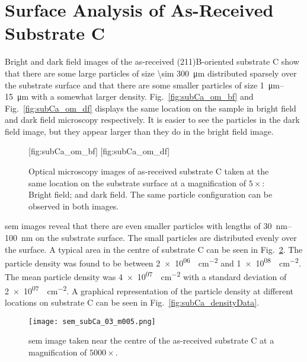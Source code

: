\clearpage
\section{Surface Analysis of As-Received Substrate C}\label{sec:subCa}

Bright and dark field images of the as-received (211)B-oriented substrate C show that there are some large particles of size \SI{\sim 300}{\micro\metre} distributed sparsely over the substrate surface and that there are some smaller particles of size \SIrange{1}{15}{\micro\metre} with a somewhat larger density. Fig.~\ref{fig:subCa_om_bf} and Fig.~\ref{fig:subCa_om_df} displays the same location on the sample in bright field and dark field microscopy respectively. It is easier to see the particles in the dark field image, but they appear larger than they do in the bright field image.

\begin{figure}[htbp]
    \centering
    [fig:subCa_om_bf]
    \hfill
    [fig:subCa_om_df]
    \caption[Bright and dark field optical microscopy images of as-received substrate C.]{Optical microscopy images of as-received substrate C taken at the same location on the substrate surface at a magnification of $5\times$:  Bright field; and  dark field. The same particle configuration can be observed in both images.}
    \label{fig:subCa_om}
\end{figure}


\Ac{sem} images reveal that there are even smaller particles with lengths of \SIrange{30}{100}{\nano\metre} on the substrate surface. The small particles are distributed evenly over the surface. A typical area in the centre of substrate C can be seen in Fig.~\ref{fig:subCa_sem_area}. The particle density was found to be between \SI{2e+06}{\particle\centi\metre^{-2}} and \SI{1e+08}{\particle\centi\metre^{-2}}. The mean particle density was \SI{4e+07}{\particle\centi\metre^{-2}} with a standard deviation of \SI{2e+07}{\particle\centi\metre^{-2}}. A graphical representation of the particle density at different locations on substrate C can be seen in Fig.~\ref{fig:subCa_densityData}.

\begin{figure}[htbp]
    \centering
    \texttt{[image: sem\_subCa\_03\_m005.png]}
    \caption[\Ac{sem} image taken near the centre of the as-received substrate C.]{\Acf{sem} image taken near the centre of the as-received substrate C at a  magnification of $5000\times$.}
    \label{fig:subCa_sem_area}
\end{figure}

